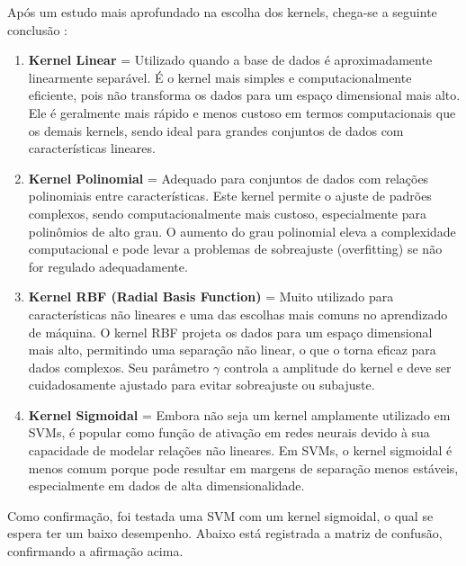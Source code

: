 \documentclass{article} %
\begin{document}
   \vspace{1cm}

   Após um estudo mais aprofundado na escolha dos kernels, chega-se a seguinte conclusão : 

   \begin{enumerate}
      \item \textbf{Kernel Linear} = Utilizado quando a base de dados é aproximadamente linearmente separável. É o kernel mais simples e computacionalmente eficiente, pois não transforma os dados para um espaço dimensional mais alto. Ele é geralmente mais rápido e menos custoso em termos computacionais que os demais kernels, sendo ideal para grandes conjuntos de dados com características lineares.

      \item \textbf{Kernel Polinomial} = Adequado para conjuntos de dados com relações polinomiais entre características. Este kernel permite o ajuste de padrões complexos, sendo computacionalmente mais custoso, especialmente para polinômios de alto grau. O aumento do grau polinomial eleva a complexidade computacional e pode levar a problemas de sobreajuste (overfitting) se não for regulado adequadamente.

      \item \textbf{Kernel RBF (Radial Basis Function)} = Muito utilizado para características não lineares e uma das escolhas mais comuns no aprendizado de máquina. O kernel RBF projeta os dados para um espaço dimensional mais alto, permitindo uma separação não linear, o que o torna eficaz para dados complexos. Seu parâmetro \(\gamma\) controla a amplitude do kernel e deve ser cuidadosamente ajustado para evitar sobreajuste ou subajuste.

      \item \textbf{Kernel Sigmoidal} = Embora não seja um kernel amplamente utilizado em SVMs, é popular como função de ativação em redes neurais devido à sua capacidade de modelar relações não lineares. Em SVMs, o kernel sigmoidal é menos comum porque pode resultar em margens de separação menos estáveis, especialmente em dados de alta dimensionalidade.

   \end{enumerate}

   Como confirmação, foi testada uma SVM com um kernel sigmoidal, o qual se espera ter um baixo desempenho. Abaixo está registrada a matriz de confusão, confirmando a afirmação acima.
\end{document}
